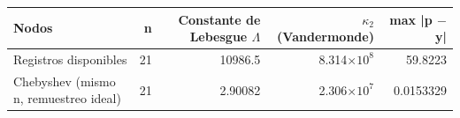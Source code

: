 {\footnotesize
\begin{longtable}{lrrrr}
\toprule
\textbf{Nodos} & \textbf{n} & \textbf{Constante de Lebesgue $\Lambda$} & \textbf{$\kappa_{2}$(Vandermonde)} & \textbf{max |p $-$ y|} \\
\midrule
\endhead
Registros disponibles & 21 & 10986.5 & 8.314$\times10^{8}$ & 59.8223 \\
Chebyshev (mismo n, remuestreo ideal) & 21 & 2.90082 & 2.306$\times10^{7}$ & 0.0153329 \\
\bottomrule
\end{longtable}
}
